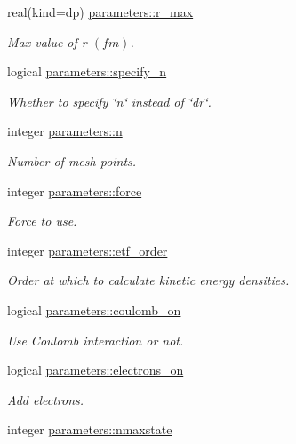 \begin{DoxyCompactItemize}
real(kind=dp) \mbox{\hyperlink{group__INPUT__PARS_ga9372571e59a93c139d629423a9104d69}{parameters\+::r\+\_\+max}}
\begin{DoxyCompactList}\small\item\em Max value of r $(fm)$. \end{DoxyCompactList}\item 
logical \mbox{\hyperlink{group__INPUT__PARS_ga65180c8e25c7c66a7ef57b72282eaecf}{parameters\+::specify\+\_\+n}}
\begin{DoxyCompactList}\small\item\em Whether to specify \char`\"{}n\char`\"{} instead of \char`\"{}dr\char`\"{}. \end{DoxyCompactList}\item 
integer \mbox{\hyperlink{group__INPUT__PARS_ga2e69dbce49f3e83688fe80de2ce83724}{parameters\+::n}}
\begin{DoxyCompactList}\small\item\em Number of mesh points. \end{DoxyCompactList}\item 
integer \mbox{\hyperlink{group__INPUT__PARS_ga4f15a67f3875d8c184795f8d71ac08aa}{parameters\+::force}}
\begin{DoxyCompactList}\small\item\em Force to use. \end{DoxyCompactList}\item 
integer \mbox{\hyperlink{group__INPUT__PARS_ga47ccf97217bda004b76720993db73258}{parameters\+::etf\+\_\+order}}
\begin{DoxyCompactList}\small\item\em Order at which to calculate kinetic energy densities. \end{DoxyCompactList}\item 
logical \mbox{\hyperlink{group__INPUT__PARS_gadebedfbc56e0abdbb5f8152a34ec9654}{parameters\+::coulomb\+\_\+on}}
\begin{DoxyCompactList}\small\item\em Use Coulomb interaction or not. \end{DoxyCompactList}\item 
logical \mbox{\hyperlink{group__INPUT__PARS_gac0158c8c810d8b150e942815ae3a4478}{parameters\+::electrons\+\_\+on}}
\begin{DoxyCompactList}\small\item\em Add electrons. \end{DoxyCompactList}\item 
integer \mbox{\hyperlink{group__INPUT__PARS_gaa0c2ce3053c1f294c8fe21270389511f}{parameters\+::nmaxstate}}

\end{DoxyCompactItemize}
